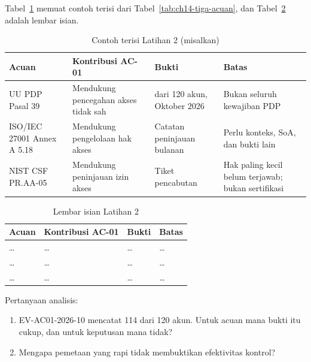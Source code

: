 Tabel~\ref{tab:ch14-lat2-contoh} memuat contoh terisi dari Tabel~\ref{tab:ch14-tiga-acuan}, dan
Tabel~\ref{tab:ch14-lat2-hasil} adalah lembar isian.

\begin{table}[!htb]
  \centering\small
  \caption{Contoh terisi Latihan 2 (misalkan)}\label{tab:ch14-lat2-contoh}
  \begin{tabularx}{\textwidth}{|>{\raggedright\arraybackslash}p{}|>{\raggedright\arraybackslash}X|>{\raggedright\arraybackslash}X|>{\raggedright\arraybackslash}X|}
    \hline
    \textbf{Acuan} & \textbf{Kontribusi AC-01} & \textbf{Bukti} & \textbf{Batas} \\ \hline
    UU PDP Pasal 39 & Mendukung pencegahan akses tidak sah & 114 dari 120 akun, Oktober 2026 & Bukan
    seluruh kewajiban PDP \\ \hline
    ISO/IEC 27001 Annex A 5.18 & Mendukung pengelolaan hak akses & Catatan peninjauan bulanan &
    Perlu konteks, SoA, dan bukti lain \\ \hline
    NIST CSF PR.AA-05 & Mendukung peninjauan izin akses & Tiket pencabutan & Hak paling kecil belum
    terjawab; bukan sertifikasi \\ \hline
  \end{tabularx}
\end{table}

\begin{table}[!htb]
  \centering\small
  \caption{Lembar isian Latihan 2}\label{tab:ch14-lat2-hasil}
  \begin{tabularx}{\textwidth}{|>{\raggedright\arraybackslash}p{}|>{\raggedright\arraybackslash}X|>{\raggedright\arraybackslash}X|>{\raggedright\arraybackslash}X|}
    \hline
    \textbf{Acuan} & \textbf{Kontribusi AC-01} & \textbf{Bukti} & \textbf{Batas} \\ \hline
    \dots & \dots & \dots & \dots \\ \hline
    \dots & \dots & \dots & \dots \\ \hline
    \dots & \dots & \dots & \dots \\ \hline
  \end{tabularx}
\end{table}

Pertanyaan analisis:
\begin{enumerate}
  \item EV-AC01-2026-10 mencatat 114 dari 120 akun. Untuk acuan mana bukti itu cukup, dan untuk
  keputusan mana tidak?
  \item Mengapa pemetaan yang rapi tidak membuktikan efektivitas kontrol?
\end{enumerate}

